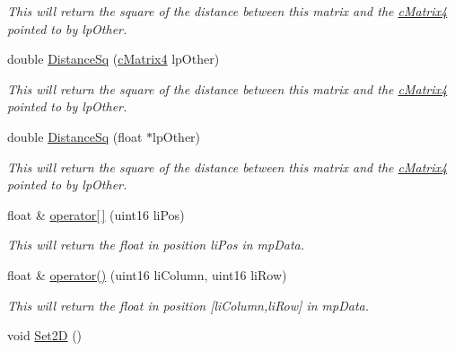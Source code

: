 \begin{DoxyCompactItemize}
\begin{DoxyCompactList}\small\item\em This will return the square of the distance between this matrix and the \hyperlink{classc_matrix4}{cMatrix4} pointed to by lpOther. \end{DoxyCompactList}\item 
\hypertarget{classc_matrix4_ad225d8db157a99b593f774e08c266722}{
double \hyperlink{classc_matrix4_ad225d8db157a99b593f774e08c266722}{DistanceSq} (\hyperlink{classc_matrix4}{cMatrix4} lpOther)}
\label{classc_matrix4_ad225d8db157a99b593f774e08c266722}

\begin{DoxyCompactList}\small\item\em This will return the square of the distance between this matrix and the \hyperlink{classc_matrix4}{cMatrix4} pointed to by lpOther. \end{DoxyCompactList}\item 
\hypertarget{classc_matrix4_ac524fac9525c6ff780e95c648b229e41}{
double \hyperlink{classc_matrix4_ac524fac9525c6ff780e95c648b229e41}{DistanceSq} (float $\ast$lpOther)}
\label{classc_matrix4_ac524fac9525c6ff780e95c648b229e41}

\begin{DoxyCompactList}\small\item\em This will return the square of the distance between this matrix and the \hyperlink{classc_matrix4}{cMatrix4} pointed to by lpOther. \end{DoxyCompactList}\item 
\hypertarget{classc_matrix4_a4b91a4d790f5a0decc76d41e54b80049}{
float \& \hyperlink{classc_matrix4_a4b91a4d790f5a0decc76d41e54b80049}{operator\mbox{[}$\,$\mbox{]}} (uint16 liPos)}
\label{classc_matrix4_a4b91a4d790f5a0decc76d41e54b80049}

\begin{DoxyCompactList}\small\item\em This will return the float in position liPos in mpData. \end{DoxyCompactList}\item 
\hypertarget{classc_matrix4_a1e17bf69091f804aec716524dbdec375}{
float \& \hyperlink{classc_matrix4_a1e17bf69091f804aec716524dbdec375}{operator()} (uint16 liColumn, uint16 liRow)}
\label{classc_matrix4_a1e17bf69091f804aec716524dbdec375}

\begin{DoxyCompactList}\small\item\em This will return the float in position \mbox{[}liColumn,liRow\mbox{]} in mpData. \end{DoxyCompactList}\item 
\hypertarget{classc_matrix4_ad24236403317622459c3309938be9d21}{
void \hyperlink{classc_matrix4_ad24236403317622459c3309938be9d21}{Set2D} ()}
\label{classc_matrix4_ad24236403317622459c3309938be9d21}


\end{DoxyCompactItemize}
